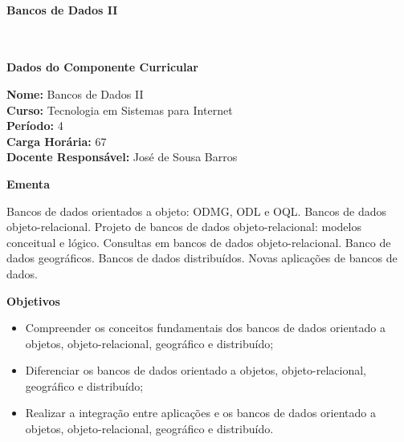 \paragraph{Bancos de Dados II} \


\begin{snugshade}\begin{center}\textbf{
	Dados do Componente Curricular
}\end{center}\end{snugshade}

\noindent 	\textbf{Nome:} Bancos de Dados II
\\ 			\textbf{Curso:} Tecnologia em Sistemas para Internet
\\ 			\textbf{Período:} \unit{4}{\degree}
\\ 			\textbf{Carga Horária:} \unit{67}{\hour}
\\ 			\textbf{Docente Responsável:} José de Sousa Barros 


\begin{snugshade}\begin{center}\textbf{
    Ementa
\vphantom{q}}\end{center}\end{snugshade}

\noindent
Bancos de dados orientados a objeto: ODMG, ODL e OQL. Bancos de dados objeto-relacional. Projeto de bancos de dados objeto-relacional: modelos conceitual e lógico. Consultas em bancos de dados objeto-relacional. Banco de dados geográficos. Bancos de dados distribuídos. Novas aplicações de bancos de dados.


\begin{snugshade}\begin{center}\textbf{
    Objetivos
}\end{center}\end{snugshade}


\begin{itemize}

\item Compreender os conceitos fundamentais dos bancos de dados orientado a objetos, objeto-relacional, geográfico e distribuído;
\item Diferenciar os bancos de dados orientado a objetos, objeto-relacional, geográfico e distribuído;
\item Realizar a integração entre aplicações e os bancos de dados orientado a objetos, objeto-relacional, geográfico e distribuído.

\end{itemize}

